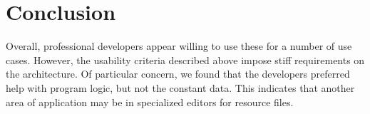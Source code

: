 \documentclass[conference]{IEEEtran}
\begin{document}
\section{Conclusion}
Overall, professional developers appear willing to use these for a number of use cases. However, the usability criteria described above impose stiff requirements on the architecture. Of particular concern, we found that the developers preferred help with program logic, but not the constant data. This indicates that another area of application may be in specialized editors for resource files.


















\end{document}
